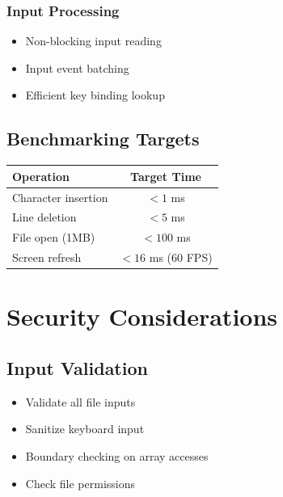 \documentclass[12pt,a4paper,oneside,openany]{report}
\begin{document}
\subsection{Input Processing}

\begin{itemize}
	\item Non-blocking input reading
	\item Input event batching
	\item Efficient key binding lookup
\end{itemize}

\section{Benchmarking Targets}

\begin{table}[H]
	\centering
	\begin{tabular}{|l|c|}
		\hline
		\textbf{Operation}  & \textbf{Target Time} \\
		\hline
		Character insertion & $< 1$ ms             \\
		\hline
		Line deletion       & $< 5$ ms             \\
		\hline
		File open (1MB)     & $< 100$ ms           \\
		\hline
		Screen refresh      & $< 16$ ms (60 FPS)   \\
		\hline
	\end{tabular}
\end{table}

\chapter{Security Considerations}

\section{Input Validation}

\begin{itemize}
	\item Validate all file inputs
	\item Sanitize keyboard input
	\item Boundary checking on array accesses
	\item Check file permissions
\end{itemize}
\end{document}
